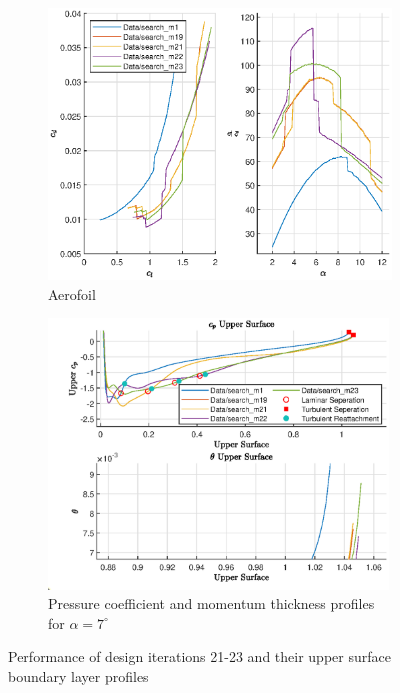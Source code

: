 \documentclass{article}
\begin{document}
\begin{figure}[H]
    \centering
    \begin{subfigure}{0.45\textwidth}
        \centering
        \includegraphics[width=1.2\textwidth, center]{figures/loRe_lod_23.eps}
        \caption{Aerofoil}
        \label{fig:m23_lod}
    \end{subfigure}
    \begin{subfigure}{0.54\textwidth}
        \centering
        \includegraphics[width=0.99\textwidth]{figures/loRe_upperprofile_23_a5.eps}
        \caption{Pressure coefficient and momentum thickness profiles for $\alpha = 7^\circ$}
        \label{fig:m23_uprofile}
    \end{subfigure}
    \caption{Performance of design iterations 21-23 and their upper surface boundary layer profiles}
\end{figure}
\end{document}
